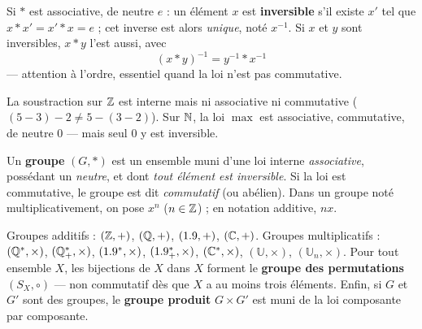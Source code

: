 \begin{propriete}[Inversibles]
Si $*$ est associative, de neutre $e$ : un élément $x$ est
\textbf{inversible} s'il existe $x'$ tel que $x*x'=x'*x=e$ ; cet inverse
est alors \emph{unique}, noté $x^{-1}$. Si $x$ et $y$ sont inversibles,
$x*y$ l'est aussi, avec
\[
  (x*y)^{-1}=y^{-1}*x^{-1}
\]
— attention à l'ordre, essentiel quand la loi n'est pas commutative.
\end{propriete}

\begin{exemple}
La soustraction sur $\mathbb{Z}$ est interne mais ni associative ni commutative
($(5-3)-2\neq5-(3-2)$). Sur $\mathbb{N}$, la loi $\max$ est associative,
commutative, de neutre $0$ — mais seul $0$ y est inversible.
\end{exemple}


\begin{definition}[Groupe]
Un \textbf{groupe} $(G,*)$ est un ensemble muni d'une loi interne
\emph{associative}, possédant un \emph{neutre}, et dont \emph{tout élément
est inversible}. Si la loi est commutative, le groupe est dit
\emph{commutatif} (ou abélien). Dans un groupe noté multiplicativement, on
pose $x^{n}$ ($n\in\mathbb{Z}$) ; en notation additive, $nx$.
\end{definition}

\begin{exemple}
Groupes additifs : $(\mathbb{Z},+)$, $(\mathbb{Q},+)$, $(1.9,+)$, $(\mathbb{C},+)$.
Groupes multiplicatifs : $(\mathbb{Q}^{*},\times)$, $(\mathbb{Q}_{+}^{*},\times)$,
$(1.9^{*},\times)$, $(1.9_{+}^{*},\times)$, $(\mathbb{C}^{*},\times)$,
$(\mathbb{U},\times)$, $(\mathbb{U}_n,\times)$.
Pour tout ensemble $X$, les bijections de $X$ dans $X$ forment le
\textbf{groupe des permutations} $(S_X,\circ)$ — non commutatif dès que $X$
a au moins trois éléments. Enfin, si $G$ et $G'$ sont des groupes, le
\textbf{groupe produit} $G\times G'$ est muni de la loi composante par
composante.
\end{exemple}


